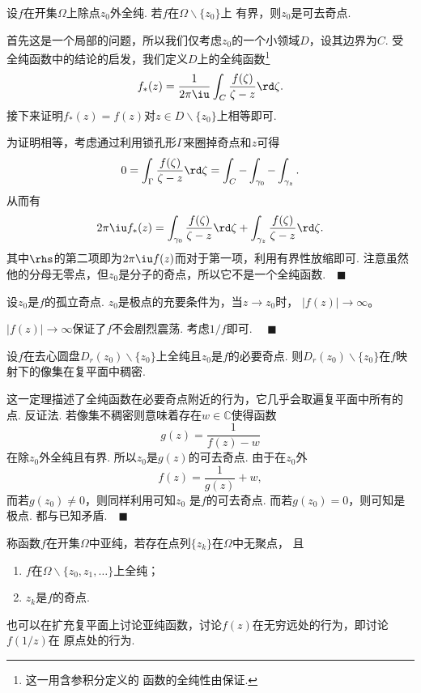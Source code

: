   \begin{thm}[Riemann]
    \label{thm: Riemann、可去奇点}
    设$f$在开集$\Omega$上除点$z_0$外全纯. 若$f$在$\Omega\backslash\{z_0\}$上
    有界，则$z_0$是可去奇点.
  \end{thm}
  \proof
    首先这是一个局部的问题，所以我们仅考虑$z_0$的一个小领域$D$，设其边界为$C$. 受
    全纯函数中的结论的启发，我们定义$D$上的全纯函数\footnote{这一用含参积分定义的
    函数的全纯性由保证.}
    \[
      f_*(z) = \frac{1}{2\pi\iu}\int_C\frac{f(\zeta)}{\zeta-z}\rd\zeta.  
    \]
    接下来证明$f_*(z)=f(z)$对$z\in D\backslash\{z_0\}$上相等即可.\par
    为证明相等，考虑通过利用锁孔形$\Gamma$来圈掉奇点和$z$可得
    \[
      0 = \int_{\Gamma}\frac{f(\zeta)}{\zeta-z}\rd\zeta = 
      \int_C - \int_{\gamma_0} - \int_{\gamma_z}.
    \]
    从而有
    \[
      2\pi\iu f_*(z) = \int_{\gamma_0}\frac{f(\zeta)}{\zeta-z}\rd\zeta
      + \int_{\gamma_z}\frac{f(\zeta)}{\zeta-z}\rd\zeta.
    \]
    其中$\rhs$的第二项即为$2\pi\iu f(z)$而对于第一项，利用有界性放缩即可. 注意虽然
    他的分母无零点，但$z_0$是分子的奇点，所以它不是一个全纯函数.$\quad\blacksquare$

  \begin{cor}
    设$z_0$是$f$的孤立奇点. $z_0$是极点的充要条件为，当$z\to z_0$时，
    $|f(z)|\to\infty$。
  \end{cor}
  \remark
    $|f(z)|\to\infty$保证了$f$不会剧烈震荡.
  \proof
    考虑$1/f$即可. $\quad\blacksquare$

  \begin{thm}
    设$f$在去心圆盘$D_r(z_0)\backslash\{z_0\}$上全纯且$z_0$是$f$的必要奇点.
    则$D_r(z_0)\backslash\{z_0\}$在$f$映射下的像集在复平面中稠密.
  \end{thm}
  \remark
    这一定理描述了全纯函数在必要奇点附近的行为，它几乎会取遍复平面中所有的点.
  \proof
    反证法. 若像集不稠密则意味着存在$w\in\mathbb{C}$使得函数
    \[
      g(z) = \frac{1}{f(z) - w}
    \]
    在除$z_0$外全纯且有界. 所以$z_0$是$g(z)$的可去奇点. 由于在$z_0$外
    \[
      f(z) = \frac{1}{g(z)} + w,
    \]
    而若$g(z_0)\ne 0$，则同样利用可知$z_0$
    是$f$的可去奇点. 而若$g(z_0)=0$，则可知是极点. 都与已知矛盾.$\quad\blacksquare$

  \begin{defi}[亚纯]
    称函数$f$在开集$\Omega$中亚纯，若存在点列$\{z_k\}$在$\Omega$中无聚点，
    且
    \begin{enumerate}
      \item $f$在$\Omega\backslash\{z_0,z_1,\dots\}$上全纯；
      \item ${z_k}$是$f$的奇点.
    \end{enumerate}
  \end{defi}
  \remark
    也可以在扩充复平面上讨论亚纯函数，讨论$f(z)$在无穷远处的行为，即讨论$f(1/z)$在
    原点处的行为.

